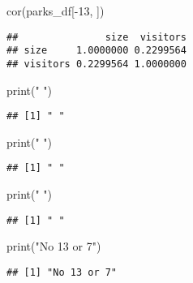 \documentclass[
]{article}
\newenvironment{Shaded}{\begin{snugshade}}{\end{snugshade}}
\newcommand{\DecValTok}[1]{\textcolor[rgb]{0.00,0.00,0.81}{#1}}
\newcommand{\FunctionTok}[1]{\textcolor[rgb]{0.00,0.00,0.00}{#1}}
\newcommand{\NormalTok}[1]{#1}
\newcommand{\SpecialCharTok}[1]{\textcolor[rgb]{0.00,0.00,0.00}{#1}}
\newcommand{\StringTok}[1]{\textcolor[rgb]{0.31,0.60,0.02}{#1}}
\begin{document}
\begin{Shaded}
\begin{Highlighting}[]
\FunctionTok{cor}\NormalTok{(parks\_df[}\SpecialCharTok{{-}}\DecValTok{13}\NormalTok{, ])}
\end{Highlighting}
\end{Shaded}

\begin{verbatim}
##               size  visitors
## size     1.0000000 0.2299564
## visitors 0.2299564 1.0000000
\end{verbatim}

\begin{Shaded}
\begin{Highlighting}[]
\FunctionTok{print}\NormalTok{(}\StringTok{" "}\NormalTok{)}
\end{Highlighting}
\end{Shaded}

\begin{verbatim}
## [1] " "
\end{verbatim}

\begin{Shaded}
\begin{Highlighting}[]
\FunctionTok{print}\NormalTok{(}\StringTok{" "}\NormalTok{)}
\end{Highlighting}
\end{Shaded}

\begin{verbatim}
## [1] " "
\end{verbatim}

\begin{Shaded}
\begin{Highlighting}[]
\FunctionTok{print}\NormalTok{(}\StringTok{" "}\NormalTok{)}
\end{Highlighting}
\end{Shaded}

\begin{verbatim}
## [1] " "
\end{verbatim}

\begin{Shaded}
\begin{Highlighting}[]
\FunctionTok{print}\NormalTok{(}\StringTok{"No 13 or 7"}\NormalTok{)}
\end{Highlighting}
\end{Shaded}

\begin{verbatim}
## [1] "No 13 or 7"
\end{verbatim}
\end{document}
